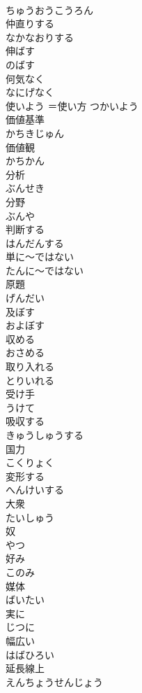 \documentclass[8pt]{extreport}
\begin{document}
\begin{CJK}{UTF8}{min}
\\	ちゅうおうこうろん
\\	仲直りする	
\\	なかなおりする
\\	伸ばす	
\\	のばす
\\	何気なく	
\\	なにげなく
\\	使いよう	＝使い方	つかいよう
\\	価値基準	
\\	かちきじゅん
\\	価値観	
\\	かちかん
\\	分析	
\\	ぶんせき
\\	分野	
\\	ぶんや
\\	判断する	
\\	はんだんする
\\	単に～ではない	
\\	たんに～ではない
\\	原題	
\\	げんだい
\\	及ぼす	
\\	およぼす
\\	収める	
\\	おさめる
\\	取り入れる	
\\	とりいれる
\\	受け手	
\\	うけて
\\	吸収する	
\\	きゅうしゅうする
\\	国力	
\\	こくりょく
\\	変形する	
\\	へんけいする
\\	大衆	
\\	たいしゅう
\\	奴	
\\	やつ
\\	好み	
\\	このみ
\\	媒体	
\\	ばいたい
\\	実に	
\\	じつに
\\	幅広い	
\\	はばひろい
\\	延長線上	
\\	えんちょうせんじょう

\end{CJK}
\end{document}
